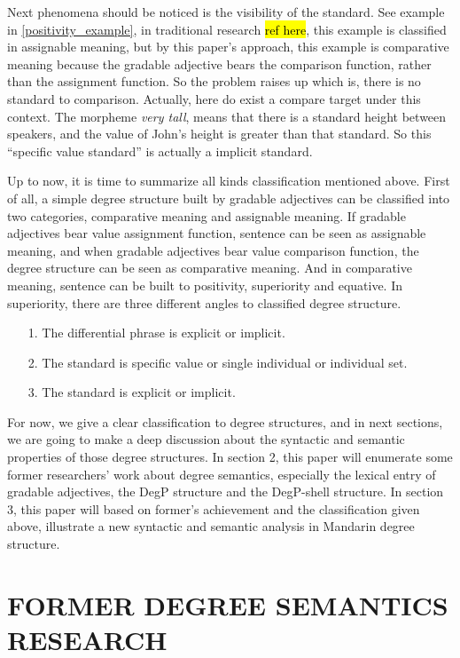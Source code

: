 \documentclass{ctexart}
\begin{document}
Next phenomena should be noticed is the visibility of the standard. See example in \ref{positivity_example}, in traditional research \hl{ref here}, this example is classified in assignable meaning, but by this paper's approach, this example is comparative meaning because the gradable adjective bears the comparison function, rather than the assignment function. So the problem raises up which is, there is no standard to comparison. Actually, here do exist a compare target under this context. The morpheme \textit{very tall}, means that there is a standard height between speakers, and the value of John's height is greater than that standard. So this ``specific value standard'' is actually a implicit standard.

Up to now, it is time to summarize all kinds classification mentioned above. First of all, a simple degree structure built by gradable adjectives can be classified into two categories, comparative meaning and assignable meaning. If gradable adjectives bear value assignment function, sentence can be seen as assignable meaning, and when gradable adjectives bear value comparison function, the degree structure can be seen as comparative meaning. And in comparative meaning, sentence can be built to positivity, superiority and equative. In superiority, there are three different angles to classified degree structure. 

\begin{itemize}
    \item[1.] The differential phrase is explicit or implicit.
    \item[2.] The standard is specific value or single individual or individual set.
    \item[3.] The standard is explicit or implicit.
\end{itemize}

For now, we give a clear classification to degree structures, and in next sections, we are going to make a deep discussion about the syntactic and semantic properties of those degree structures. In section 2, this paper will enumerate some former researchers' work about degree semantics, especially the lexical entry of gradable adjectives, the DegP structure and the DegP-shell structure. In section 3, this paper will based on former's achievement and the classification given above, illustrate a new syntactic and semantic analysis in Mandarin degree structure.

\section{FORMER DEGREE SEMANTICS RESEARCH}
\end{document}
